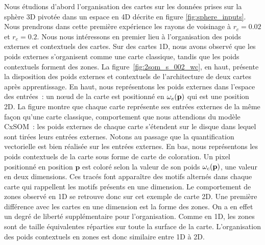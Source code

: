 \documentclass[../main]{subfiles}
\begin{document}
Nous étudions d'abord l'organisation des cartes sur les données prises sur la sphère 3D pivotée dans un espace en 4D décrite en figure \ref{fig:sphere_inputs}. Nous prendrons dans cette première expérience les rayons de voisinage à $r_c = 0.02$ et $r_e = 0.2$. 
Nous nous intéressons en premier lieu à l'organisation des poids externes et contextuels des cartes. Sur des cartes 1D, nous avons observé que les poids externes s'organisent comme une carte classique, tandis que les poids contextuels forment des zones.
La figure~\ref{fig:2som_s_002_wc}, en haut, présente la disposition des poids externes et contextuels de l'architecture de deux cartes après apprentissage.
En haut, nous représentons les poids externes dans l'espace des entrées~: un n\oe{}ud de la carte est positionné en $\omega_e(\mathbf{p})$ qui est une position 2D.
La figure montre que chaque carte représente ses entrées externes de la même façon qu'une carte classique, comportement que nous attendions du modèle CxSOM~: les poids externes de chaque carte s'étendent sur le disque dans lequel sont tirées leurs entrées externes. Notons au passage que la quantification vectorielle est bien réalisée sur les entrées externes.
En bas, nous représentons les poids contextuels de la carte sous forme de carte de coloration. Un pixel positionné en position $\mathbf{p}$ est coloré selon la valeur de son poids $\omega_c(\mathbf{p})$, une valeur en deux dimensions.
Ces tracés font apparaître des motifs alternés dans chaque carte qui rappellent les motifs présents en une dimension. Le comportement de zones observé en 1D se retrouve donc sur cet exemple de carte 2D.
Une première différence avec les cartes en une dimension est la forme des zones. On a en effet un degré de liberté supplémentaire pour l'organisation.
Comme en 1D, les zones sont de taille équivalentes réparties sur toute la surface de la carte. L'organisation des poids contextuels en zones est donc similaire entre 1D à 2D.
\end{document}
